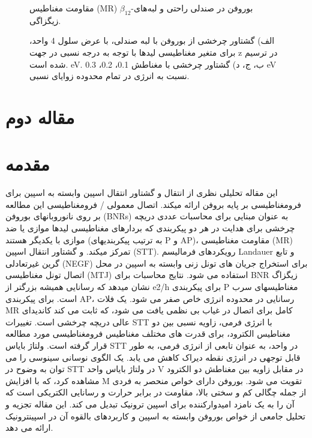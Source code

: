 \begin{figure}
\centering
\resizebox{0.45\textwidth}{!}{}
\resizebox{0.45\textwidth}{!}{}
\caption{مقاومت مغناطیس (MR) $\beta_{12}$-بوروفن در صندلی راحتی و لبه‌های زیگزاگی.}
\label{fig:MR}
\end{figure}

\begin{figure}[ht]
    \centering
    \resizebox{0.45\textwidth}{!}{}
    \resizebox{0.45\textwidth}{!}{}
    \resizebox{0.45\textwidth}{!}{}
    \resizebox{0.45\textwidth}{!}{}
    \caption{الف) گشتاور چرخشی از بوروفن با لبه صندلی، با عرض سلول 4 واحد، برای متغیر مغناطیسی لیدها با توجه به درجه نسبی در جهت z در  ترسیم شده است. eV. ب، ج، د) گشتاور چرخشی با مغناطش 0.1، 0.2، 0.3 eV نسبت به انرژی در تمام محدوده زوایای نسبی.}
    \label{fig:stt}
\end{figure}

\section{مقاله دوم}
\section{مقدمه}
این مقاله تحلیلی نظری از انتقال و گشتاور انتقال اسپین وابسته به اسپین برای فرومغناطیسی بر پایه بروفن ارائه میکند. اتصال معمولی / فرومغناطیسی این مطالعه بر روی نانوروبانهای بوروفن (BNRs) به عنوان مبنایی برای محاسبات عددی دریچه چرخشی برای هدایت در هر دو پیکربندی که بردارهای مغناطیسی لیدها موازی یا ضد موازی با یکدیگر هستند (به ترتیب پیکربندیهای P و AP)، مقاومت مغناطیسی (MR) تمرکز میکند. و گشتاور انتقال اسپین (STT). رویکردهای فرمالیسم Landauer و تابع گرین غیرتعادلی (NEGF) برای استخراج جریان های تونل زنی وابسته به اسپین در محل اتصال تونل مغناطیسی (MTJ) استفاده می شود. نتایج محاسبات برای BNR زیگزاگ نشان میدهد که رسانایی همیشه بزرگتر از e2/h برای پیکربندی P مغناطیسهای سرب است. برای پیکربندی AP، رسانایی در محدوده انرژی خاص صفر می شود. یک فلات MR کامل برای اتصال در غیاب بی نظمی یافت می شود، که ثابت می کند کاندیدای عالی دریچه چرخشی است. تغییرات STT با انرژی فرمی، زاویه نسبی بین دو مغناطیس الکترود، برای قدرت های مختلف مغناطیس فرومغناطیسی مورد مطالعه قرار گرفته است. ولتاژ بایاس STT در واحد، به عنوان تابعی از انرژی فرمی، به طور قابل توجهی در انرژی نقطه دیراک کاهش می یابد. یک الگوی نوسانی سینوسی را می توان به وضوح در STT در ولتاژ بایاس واحد V در مقابل زاویه بین مغناطش دو الکترود مشاهده کرد، که با افزایش M تقویت می شود. بوروفن دارای خواص منحصر به فردی از جمله چگالی کم و سختی بالا، مقاومت در برابر حرارت و رسانایی الکتریکی است که آن را به یک نامزد امیدوارکننده برای اسپین ترونیک تبدیل می کند. این مقاله تجزیه و تحلیل جامعی از خواص بوروفن وابسته به اسپین و کاربردهای بالقوه آن در اسپینترونیک ارائه می دهد.

